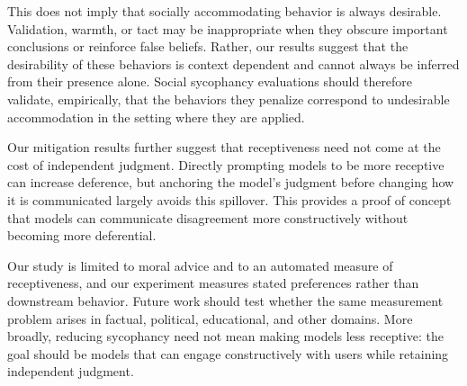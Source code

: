 \documentclass[letterpaper]{article} %
\newcommand{\todo}[1]{{\upshape[\textbf{TODO}: #1]}}
\begin{document}
This does not imply that socially accommodating behavior is always desirable. Validation, warmth, or tact may be inappropriate when they obscure important conclusions or reinforce false beliefs. Rather, our results suggest that the desirability of these behaviors is context dependent and cannot always be inferred from their presence alone. Social sycophancy evaluations should therefore validate, empirically, that the behaviors they penalize correspond to undesirable accommodation in the setting where they are applied.

Our mitigation results further suggest that receptiveness need not come at the cost of independent judgment. Directly prompting models to be more receptive can increase deference, but anchoring the model's judgment before changing how it is communicated largely avoids this spillover. This provides a proof of concept that models can communicate disagreement more constructively without becoming more deferential.

Our study is limited to moral advice and to an automated measure of receptiveness, and our experiment measures stated preferences rather than downstream behavior. Future work should test whether the same measurement problem arises in factual, political, educational, and other domains. More broadly, reducing sycophancy need not mean making models less receptive: the goal should be models that can engage constructively with users while retaining independent judgment.



\end{document}
